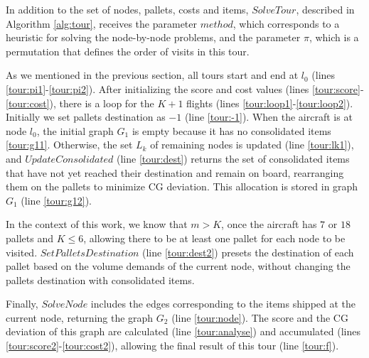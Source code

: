 \documentclass[preprint,authoryear]{elsarticle}
\begin{document}
In addition to the set of nodes, pallets, costs and items, $SolveTour$, described in Algorithm \ref{alg:tour}, receives the parameter $method$, which corresponds to a heuristic for solving the node-by-node problems, and the parameter $\pi$, which is a permutation that defines the order of visits in this tour.

As we mentioned in the previous section, all tours start and end at $l_0$\/ (lines \ref{tour:pi1}-\ref{tour:pi2}).
After initializing the score and cost values (lines \ref{tour:score}-\ref{tour:cost}), there is a loop for the $K+1$\/ flights (lines \ref{tour:loop1}-\ref{tour:loop2}). Initially we set pallets destination as $-1$\/ (line \ref{tour:-1}). When the aircraft is at node $l_0$, the initial graph $G_1$\/ is empty because it has no consolidated items \ref{tour:g11}. Otherwise, the set $L_k$\/ of remaining nodes is updated (line \ref{tour:lk1}), and $UpdateConsolidated$\/ (line \ref{tour:dest}) returns the set of consolidated items that have not yet reached their destination and remain on board, rearranging them on the pallets to minimize CG deviation. This allocation is stored in graph $G_1$\/ (line \ref{tour:g12}).

In the context of this work, we know that $m>K$, once the aircraft has $7$\/ or $18$\/ pallets and $K\leq 6$, allowing there to be at least one pallet for each node to be visited. $SetPalletsDestination$\/ (line \ref{tour:dest2}) presets the destination of each pallet based on the volume demands of the current node, without changing the pallets destination with consolidated items.

Finally, $SolveNode$\/ includes the edges corresponding to the items shipped at the current node, returning the graph $G_2$\/ (line \ref{tour:node}). The score and the CG deviation of this graph are calculated (line \ref{tour:analyse}) and accumulated (lines \ref{tour:score2}-\ref{tour:cost2}), allowing the final result of this tour (line \ref{tour:f}).
\end{document}
